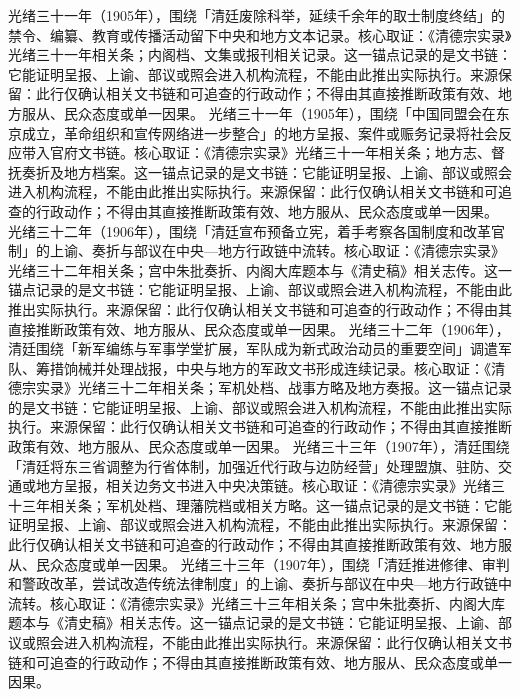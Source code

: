 光绪三十一年（1905年），围绕「清廷废除科举，延续千余年的取士制度终结」的禁令、编纂、教育或传播活动留下中央和地方文本记录。核心取证：《清德宗实录》光绪三十一年相关条；内阁档、文集或报刊相关记录。这一锚点记录的是文书链：它能证明呈报、上谕、部议或照会进入机构流程，不能由此推出实际执行。来源保留：此行仅确认相关文书链和可追查的行政动作；不得由其直接推断政策有效、地方服从、民众态度或单一因果。
光绪三十一年（1905年），围绕「中国同盟会在东京成立，革命组织和宣传网络进一步整合」的地方呈报、案件或赈务记录将社会反应带入官府文书链。核心取证：《清德宗实录》光绪三十一年相关条；地方志、督抚奏折及地方档案。这一锚点记录的是文书链：它能证明呈报、上谕、部议或照会进入机构流程，不能由此推出实际执行。来源保留：此行仅确认相关文书链和可追查的行政动作；不得由其直接推断政策有效、地方服从、民众态度或单一因果。
光绪三十二年（1906年），围绕「清廷宣布预备立宪，着手考察各国制度和改革官制」的上谕、奏折与部议在中央—地方行政链中流转。核心取证：《清德宗实录》光绪三十二年相关条；宫中朱批奏折、内阁大库题本与《清史稿》相关志传。这一锚点记录的是文书链：它能证明呈报、上谕、部议或照会进入机构流程，不能由此推出实际执行。来源保留：此行仅确认相关文书链和可追查的行政动作；不得由其直接推断政策有效、地方服从、民众态度或单一因果。
光绪三十二年（1906年），清廷围绕「新军编练与军事学堂扩展，军队成为新式政治动员的重要空间」调遣军队、筹措饷械并处理战报，中央与地方的军政文书形成连续记录。核心取证：《清德宗实录》光绪三十二年相关条；军机处档、战事方略及地方奏报。这一锚点记录的是文书链：它能证明呈报、上谕、部议或照会进入机构流程，不能由此推出实际执行。来源保留：此行仅确认相关文书链和可追查的行政动作；不得由其直接推断政策有效、地方服从、民众态度或单一因果。
光绪三十三年（1907年），清廷围绕「清廷将东三省调整为行省体制，加强近代行政与边防经营」处理盟旗、驻防、交通或地方呈报，相关边务文书进入中央决策链。核心取证：《清德宗实录》光绪三十三年相关条；军机处档、理藩院档或相关方略。这一锚点记录的是文书链：它能证明呈报、上谕、部议或照会进入机构流程，不能由此推出实际执行。来源保留：此行仅确认相关文书链和可追查的行政动作；不得由其直接推断政策有效、地方服从、民众态度或单一因果。
光绪三十三年（1907年），围绕「清廷推进修律、审判和警政改革，尝试改造传统法律制度」的上谕、奏折与部议在中央—地方行政链中流转。核心取证：《清德宗实录》光绪三十三年相关条；宫中朱批奏折、内阁大库题本与《清史稿》相关志传。这一锚点记录的是文书链：它能证明呈报、上谕、部议或照会进入机构流程，不能由此推出实际执行。来源保留：此行仅确认相关文书链和可追查的行政动作；不得由其直接推断政策有效、地方服从、民众态度或单一因果。
